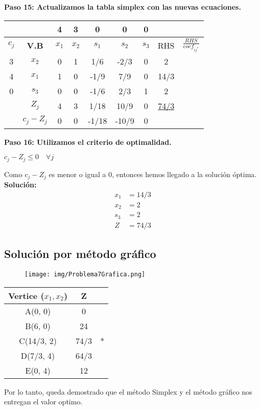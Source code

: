 \documentclass{templateNote}
\begin{document}
\textbf{Paso 15: Actualizamos la tabla simplex con las nuevas ecuaciones.}
\begin{center}
    \begin{tabular}{|c|c|c|c|c|c|c|c|c|}
        \hline
        & & 4 & 3 & 0 & 0 & 0 &  &  \\ \hline
        $c_j$ & \textbf{V.B} & $x_1$ & $x_2$ & $s_1$ & $s_2$ & $s_3$ & RHS & $\displaystyle\frac{RHS}{coef_{ij^*}}$ \\ \hline
        3 & $x_2$ & 0 & 1 & 1/6 & -2/3 & 0 & 2 & \\ \hline
        4 & $x_1$ & 1 & 0 & -1/9 & 7/9 & 0 & 14/3 & \\ \hline
        0 & $s_3$ & 0 & 0 & -1/6 & 2/3 & 1 & 2 & \\ \hline
        & $Z_j$ & 4 & 3 & 1/18 & 10/9 & 0 & \underline{74/3} &  \\ \hline
        & $c_j - Z_j$ & 0 & 0 & -1/18 & -10/9 & 0 &  &  \\ \hline
    \end{tabular}
\end{center}

\textbf{Paso 16: Utilizamos el criterio de optimalidad.}
\begin{center}
    $c_j - Z_j \leq 0 \quad \forall j$
\end{center}

Como $c_j - Z_j$ es menor o igual a 0, entonces hemos llegado a la solución óptima.
\textbf{Solución:}
\begin{align*}
    x_1 &= 14/3 \\
    x_2 &= 2 \\
    s_3 &= 2 \\
    Z &= 74/3
\end{align*}

\newpage
\subsection*{Solución por método gráfico}
\begin{figure}[H]
    \centering
    \texttt{[image: img/Problema7Grafica.png]}
\end{figure}

\begin{center}
    \begin{tabular}{|c|c|c|}
        \hline
        \textbf{Vertice ($x_1,x_2$)} & Z &  \\ \hline
        A(0, 0) & 0 & \\ \hline
        B(6, 0) & 24 & \\ \hline
        C(14/3, 2) & 74/3 & * \\ \hline
        D(7/3, 4) & 64/3 & \\ \hline
        E(0, 4) & 12 & \\ \hline
    \end{tabular}
\end{center}

Por lo tanto, queda demostrado que el método Simplex y el método gráfico nos entregan el valor optimo.
\end{document}
